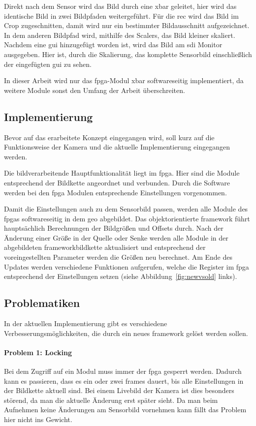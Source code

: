 Direkt nach dem Sensor wird das Bild durch eine \ac{xbar} geleitet, hier wird das identische Bild in zwei Bildpfaden weitergeführt. Für die \acl{rec} wird das Bild im Crop zugeschnitten, damit wird nur ein bestimmter Bildausschnitt aufgezeichnet. In dem anderen Bildpfad wird, mithilfe des Scalers, das Bild kleiner skaliert. Nachdem eine \ac{gui} hinzugefügt worden ist, wird das Bild am \ac{sdi} Monitor ausgegeben. Hier ist, durch die Skalierung, das komplette Sensorbild einschließlich der eingefügten \ac{gui} zu sehen.

In dieser Arbeit wird nur das \ac{fpga}-Modul \ac{xbar} softwareseitig implementiert, da weitere Module sonst den Umfang der Arbeit überschreiten.

\subsection{Implementierung}
Bevor auf das erarbeitete Konzept eingegangen wird, soll kurz auf die Funktionsweise der Kamera und die aktuelle Implementierung eingegangen werden.

Die bildverarbeitende Hauptfunktionalität liegt im \ac{fpga}. Hier sind die Module entsprechend der Bildkette angeordnet und verbunden. Durch die Software werden bei den \ac{fpga} Modulen entsprechende Einstellungen vorgenommen.

Damit die Einstellungen auch zu dem Sensorbild passen, werden alle Module des \ac{fpga}s softwareseitig in dem \ac{geo} abgebildet. Das objektorientierte \gls{framework} führt hauptsächlich Berechnungen der Bildgrößen und Offsets durch. Nach der Änderung einer Größe in der Quelle oder Senke werden alle Module in der abgebildeten \gls{framework}bildkette aktualisiert und entsprechend der voreingestellten Parameter werden die Größen neu berechnet. Am Ende des Updates werden verschiedene Funktionen aufgerufen, welche die Register im \ac{fpga} entsprechend der Einstellungen setzen (siehe Abbildung~\ref{fig:newvsold} links).


\subsection{Problematiken}\label{sec:prob}
In der aktuellen Implementierung gibt es verschiedene Verbesserungsmöglichkeiten, die durch ein neues \gls{framework} gelöst werden sollen.

\paragraph*{Problem 1: Locking} Bei dem Zugriff auf ein Modul muss immer der \ac{fpga} gesperrt werden. Dadurch kann es passieren, dass es ein oder zwei \glspl{frame} dauert, bis alle Einstellungen in der Bildkette aktuell sind. Bei einem Livebild der Kamera ist dies besonders störend, da man die aktuelle Änderung erst später sieht. Da man beim Aufnehmen keine Änderungen am Sensorbild vornehmen kann fällt das Problem hier nicht ins Gewicht.


